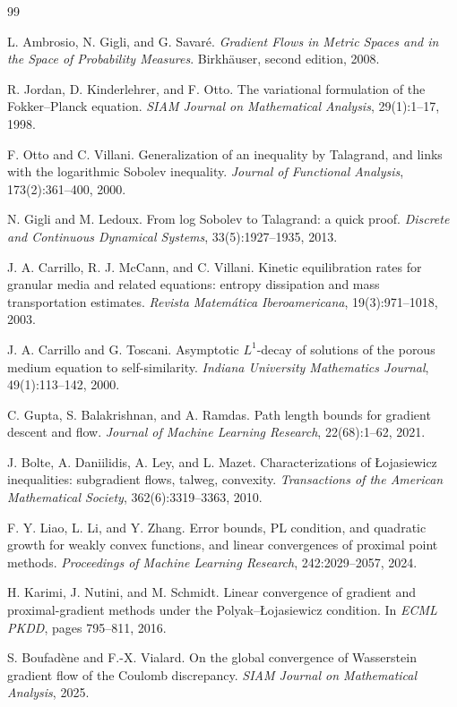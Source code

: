 \documentclass[11pt]{article}
\theoremstyle{definition}
\begin{document}
\begin{thebibliography}{99}

L. Ambrosio, N. Gigli, and G. Savar\'e.
\newblock \emph{Gradient Flows in Metric Spaces and in the Space of Probability Measures}.
\newblock Birkh\"auser, second edition, 2008.

R. Jordan, D. Kinderlehrer, and F. Otto.
\newblock The variational formulation of the Fokker--Planck equation.
\newblock \emph{SIAM Journal on Mathematical Analysis}, 29(1):1--17, 1998.

F. Otto and C. Villani.
\newblock Generalization of an inequality by Talagrand, and links with the logarithmic Sobolev inequality.
\newblock \emph{Journal of Functional Analysis}, 173(2):361--400, 2000.

N. Gigli and M. Ledoux.
\newblock From log Sobolev to Talagrand: a quick proof.
\newblock \emph{Discrete and Continuous Dynamical Systems}, 33(5):1927--1935, 2013.

J. A. Carrillo, R. J. McCann, and C. Villani.
\newblock Kinetic equilibration rates for granular media and related equations: entropy dissipation and mass transportation estimates.
\newblock \emph{Revista Matem\'atica Iberoamericana}, 19(3):971--1018, 2003.

J. A. Carrillo and G. Toscani.
\newblock Asymptotic $L^1$-decay of solutions of the porous medium equation to self-similarity.
\newblock \emph{Indiana University Mathematics Journal}, 49(1):113--142, 2000.


C. Gupta, S. Balakrishnan, and A. Ramdas.
\newblock Path length bounds for gradient descent and flow.
\newblock \emph{Journal of Machine Learning Research}, 22(68):1--62, 2021.

J. Bolte, A. Daniilidis, A. Ley, and L. Mazet.
\newblock Characterizations of {\L}ojasiewicz inequalities: subgradient flows, talweg, convexity.
\newblock \emph{Transactions of the American Mathematical Society}, 362(6):3319--3363, 2010.

F. Y. Liao, L. Li, and Y. Zhang.
\newblock Error bounds, PL condition, and quadratic growth for weakly convex functions, and linear convergences of proximal point methods.
\newblock \emph{Proceedings of Machine Learning Research}, 242:2029--2057, 2024.

H. Karimi, J. Nutini, and M. Schmidt.
\newblock Linear convergence of gradient and proximal-gradient methods under the Polyak--{\L}ojasiewicz condition.
\newblock In \emph{ECML PKDD}, pages 795--811, 2016.

S. Boufad\`ene and F.-X. Vialard.
\newblock On the global convergence of Wasserstein gradient flow of the Coulomb discrepancy.
\newblock \emph{SIAM Journal on Mathematical Analysis}, 2025.

\end{thebibliography}
\end{document}
